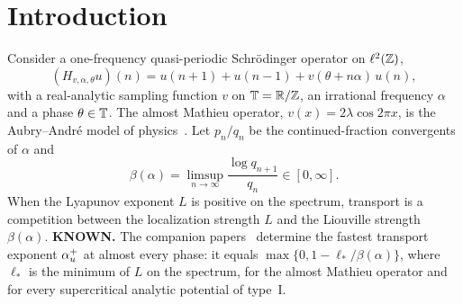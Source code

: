 \section{Introduction}\label{sec:intro}

Consider a one-frequency quasi-periodic Schr\"odinger operator on $\ell^2(\mathbb Z)$,
\begin{equation}\label{eq:qp}
(H_{v,\alpha,\theta}u)(n)=u(n+1)+u(n-1)+v(\theta+n\alpha)\,u(n),
\end{equation}
with a real-analytic sampling function $v$ on $\mathbb T=\mathbb R/\mathbb Z$, an irrational frequency $\alpha$ and a phase $\theta\in\mathbb T$. The almost Mathieu operator, $v(x)=2\lambda\cos2\pi x$, is the Aubry--Andr\'e model of physics~\cite{AubryAndre1980}. Let $p_n/q_n$ be the continued-fraction convergents of $\alpha$ and
\begin{equation}\label{eq:beta}
\beta(\alpha)=\limsup_{n\to\infty}\frac{\log q_{n+1}}{q_n}\in[0,\infty].
\end{equation}
When the Lyapunov exponent $L$ is positive on the spectrum, transport is a competition between the localization strength $L$ and the Liouville strength $\beta(\alpha)$. \textbf{KNOWN.} The companion papers~\cite{DMamo,DMuniv} determine the fastest transport exponent $\alpha_u^+$ at almost every phase: it equals $\max\{0,1-\ell_*/\beta(\alpha)\}$, where $\ell_*$ is the minimum of $L$ on the spectrum, for the almost Mathieu operator and for every supercritical analytic potential of type~I.

